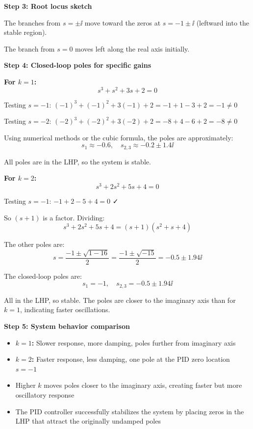 \documentclass[11pt,a4paper]{article}
\begin{document}
\textbf{Step 3: Root locus sketch}

The branches from $s = \pm \ii$ move toward the zeros at $s = -1 \pm \ii$ (leftward into the stable region).

The branch from $s = 0$ moves left along the real axis initially.

\textbf{Step 4: Closed-loop poles for specific gains}

\textbf{For $k = 1$:}
\begin{equation}
  s^3 + s^2 + 3s + 2 = 0
\end{equation}

Testing $s = -1$: $(-1)^3 + (-1)^2 + 3(-1) + 2 = -1 + 1 - 3 + 2 = -1 \neq 0$

Testing $s = -2$: $(-2)^3 + (-2)^2 + 3(-2) + 2 = -8 + 4 - 6 + 2 = -8 \neq 0$

Using numerical methods or the cubic formula, the poles are approximately:
\begin{equation}
  s_1 \approx -0.6, \quad s_{2,3} \approx -0.2 \pm 1.4\ii
\end{equation}

All poles are in the LHP, so the system is stable.

\textbf{For $k = 2$:}
\begin{equation}
  s^3 + 2s^2 + 5s + 4 = 0
\end{equation}

Testing $s = -1$: $-1 + 2 - 5 + 4 = 0$ ✓

So $(s + 1)$ is a factor. Dividing:
\begin{equation}
  s^3 + 2s^2 + 5s + 4 = (s+1)(s^2 + s + 4)
\end{equation}

The other poles are:
\begin{equation}
  s = \frac{-1 \pm \sqrt{1 - 16}}{2} = \frac{-1 \pm \sqrt{-15}}{2} = -0.5 \pm 1.94\ii
\end{equation}

The closed-loop poles are:
\begin{equation}
  s_1 = -1, \quad s_{2,3} = -0.5 \pm 1.94\ii
\end{equation}

All in the LHP, so stable. The poles are closer to the imaginary axis than for $k=1$, indicating faster oscillations.

\textbf{Step 5: System behavior comparison}

\begin{itemize}
  \item \textbf{$k = 1$:} Slower response, more damping, poles further from imaginary axis
  \item \textbf{$k = 2$:} Faster response, less damping, one pole at the PID zero location $s = -1$
  \item Higher $k$ moves poles closer to the imaginary axis, creating faster but more oscillatory response
  \item The PID controller successfully stabilizes the system by placing zeros in the LHP that attract the originally undamped poles
\end{itemize}
\end{document}
